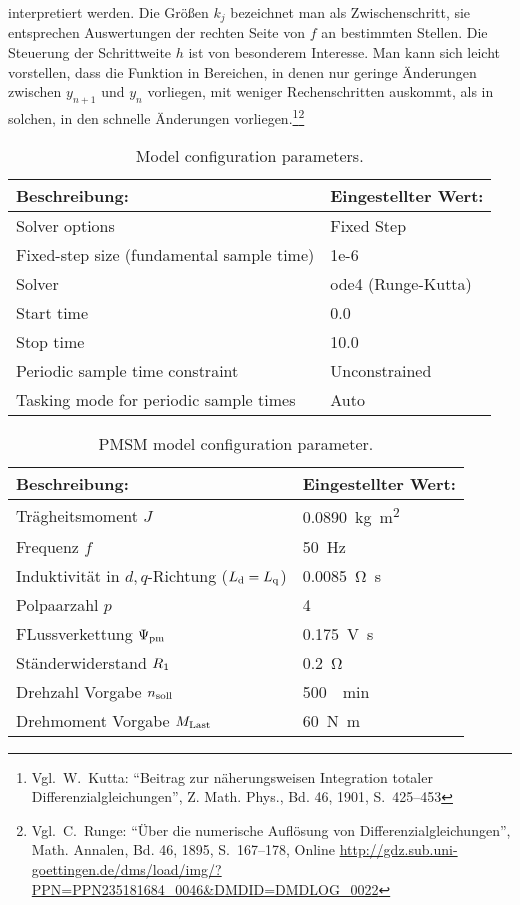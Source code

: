 interpretiert werden.
Die Größen $k_j$ bezeichnet man als Zwischenschritt, sie entsprechen Auswertungen der rechten Seite von $f$ an bestimmten Stellen.
Die Steuerung der Schrittweite $h$ ist von besonderem Interesse.
Man kann sich leicht vorstellen, dass die Funktion in Bereichen, in denen nur geringe Änderungen zwischen $y_{n+1}$ und $y_n$ vorliegen, mit weniger Rechenschritten auskommt, als in solchen, in den schnelle Änderungen vorliegen.\footnote{Vgl.~W.\ Kutta: \enquote{Beitrag zur näherungsweisen Integration totaler Differenzialgleichungen}, Z. Math. Phys., Bd. 46, 1901, S.~425--453}\footnote{Vgl.~C.\ Runge: \enquote{Über die numerische Auflösung von Differenzialgleichungen}, Math. Annalen, Bd. 46, 1895, S.~167--178, Online \url{http://gdz.sub.uni-goettingen.de/dms/load/img/?PPN=PPN235181684_0046&DMDID=DMDLOG_0022}}


\begin{table}[h!]
	\centering
	\caption{Model configuration parameters.}
	\label{tab:model-parameter}
	\begin{tabularx}{0.8\textwidth}{ll}
		\toprule
		Beschreibung: & Eingestellter Wert: \\
		\midrule
		Solver options	& Fixed Step\\
		Fixed-step size (fundamental sample time)	& 1e-6 \\
		Solver	& ode4 (Runge-Kutta) \\
		Start time & 0.0 \\
		Stop time & 10.0\\
		Periodic sample time constraint & Unconstrained \\
		Tasking mode for periodic sample times & Auto \\
		\bottomrule
	\end{tabularx}
\end{table}
\begin{table}[h!]
	\centering
	\caption{PMSM model configuration parameter.}
	\label{tab:pmsm-parameter}
	\begin{tabularx}{0.8\textwidth}{ll}
		\toprule
		Beschreibung: & Eingestellter Wert: \\
		\midrule
		Trägheitsmoment $J$ & \SI{0.0890}{\kilogram\square\meter} \\
		Frequenz $f$ & \SI{50}{\hertz}\\
		Induktivität in $d,q$-Richtung ($L_{\mathrm{d}}=L_{\mathrm{q}}$) & \SI{0.0085}{\ohm\second}\\
		Polpaarzahl $p$ & 4 \\
		FLussverkettung $\Psi_{\mathrm{pm}}$ & \SI{0.175}{\volt\second}\\
		Ständerwiderstand $R_{\mathrm{1}}$ & \SI{0.2}{\ohm}\\
		Drehzahl Vorgabe $n_{\mathrm{soll}}$ & \SI{500}{\per\minute}\\
		Drehmoment Vorgabe $M_{\mathrm{Last}}$ & \SI{60}{\newton\meter}\\
		\bottomrule
	\end{tabularx}
\end{table}
\verylongpage
\newpage
